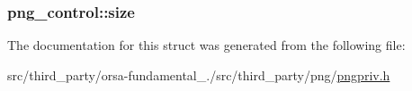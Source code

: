 \subsubsection[{size}]{ png\+\_\+control\+::size}\label{structpng__control_acd4e0d9812d5efe466d5401268149ad9}


The documentation for this struct was generated from the following file\+:\begin{DoxyCompactItemize}
\item 
src/third\+\_\+party/orsa-\/fundamental\+\_./src/third\+\_\+party/png/\hyperlink{pngpriv_8h}{pngpriv.\+h}\end{DoxyCompactItemize}
